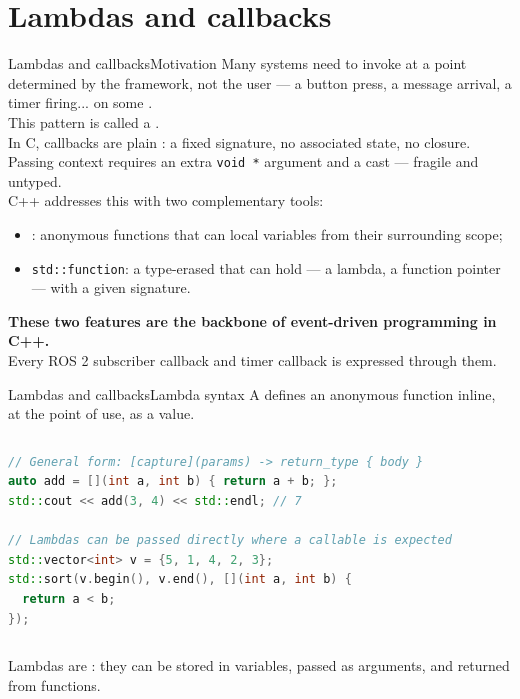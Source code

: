 
\section{Lambdas and callbacks}
\graphicspath{{figs/section4/}}

\begin{frame}{Lambdas and callbacks}{Motivation}
	\justifying
	Many systems need to invoke  at a point determined by the framework, not the user — a button press, a message arrival, a timer firing... on some .\\
	This pattern is called a .\\
	\bigskip
	In C, callbacks are plain : a fixed signature, no associated state, no closure.\\
	Passing context requires an extra \texttt{void *} argument and a cast — fragile and untyped.\\
	\bigskip
	C++ addresses this with two complementary tools:
	\begin{itemize}
		\item {}: anonymous functions that can  local variables from their surrounding scope;
		\item \texttt{std::function}: a type-erased  that can hold  — a lambda, a function pointer — with a given signature.
	\end{itemize}
	\begin{block}{}
		\centering
		\textbf{These two features are the backbone of event-driven programming in C++.}\\
		Every ROS 2 subscriber callback and timer callback is expressed through them.
	\end{block}
\end{frame}
\begin{frame}[fragile]{Lambdas and callbacks}{Lambda syntax}
	\justifying
	A  defines an anonymous function inline, at the point of use, as a value.\\
	\begin{columns}
		\begin{lstlisting}[style=codebeamer, language=C++, caption=Lambda syntax and basic examples.]
// General form: [capture](params) -> return_type { body }
auto add = [](int a, int b) { return a + b; };
std::cout << add(3, 4) << std::endl; // 7

// Lambdas can be passed directly where a callable is expected
std::vector<int> v = {5, 1, 4, 2, 3};
std::sort(v.begin(), v.end(), [](int a, int b) {
  return a < b;
});
    \end{lstlisting}
	\end{columns}
	Lambdas are : they can be stored in variables, passed as arguments, and returned from functions.
\end{frame}
